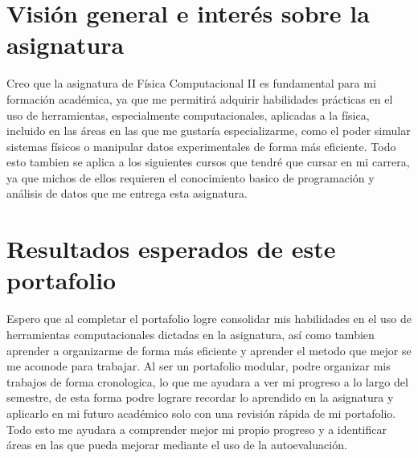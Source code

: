 \documentclass[../portafolio.tex]{subfiles}
\begin{document}
\section*{Visión general e interés sobre la asignatura}

Creo que la asignatura de Física Computacional II es fundamental para mi
formación académica, ya que me permitirá adquirir habilidades prácticas
en el uso de herramientas, especialmente computacionales, aplicadas a la
física, incluido en las áreas en las que me gustaría especializarme, como
el poder simular sistemas físicos o manipular datos experimentales de forma
más eficiente. Todo esto tambien se aplica a los siguientes cursos que
tendré que cursar en mi carrera, ya que michos de ellos requieren el
conocimiento basico de programación y análisis de datos que me entrega 
esta asignatura.

\section*{Resultados esperados de este portafolio}

Espero que al completar el portafolio logre consolidar mis habilidades en
el uso de herramientas computacionales dictadas en la asignatura, así como
tambien aprender a organizarme de forma más eficiente y aprender el metodo
que mejor se me acomode para trabajar. Al ser un portafolio modular, podre 
organizar mis trabajos de forma cronologica, lo que me ayudara a ver mi
progreso a lo largo del semestre, de esta forma podre lograre recordar
lo aprendido en la asignatura y aplicarlo en mi futuro académico solo con
una revisión rápida de mi portafolio. Todo esto me ayudara a comprender
mejor mi propio progreso y a identificar áreas en las que pueda mejorar
mediante el uso de la autoevaluación. 
\end{document}
